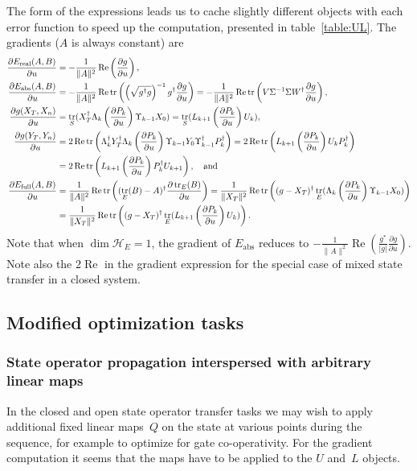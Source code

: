 \documentclass[aps, pra, a4paper, longbibliography, superscriptaddress]{revtex4-1}
\newcommand{\hilb}[1]{\mathcal{#1}}
\DeclareMathOperator{\tr}{tr}
\DeclareMathOperator{\re}{Re}
\newcommand{\spr}{\Upsilon}
\newcommand{\Xt}{X_T}  %
\newcommand{\Xo}{X_0}  %
\newcommand{\Xn}{X_n}  %
\newcommand{\dd}[2]{\frac{\partial #1}{\partial #2}}
\begin{document}
The form of the expressions leads us to cache slightly different objects with
each error function to speed up the computation, presented in table~\ref{table:UL}.
The gradients ($A$ is always constant) are
\begin{align}
\dd{E_\text{real}(A,B)}{u}
&= -\frac{1}{\|A\|^2} \re \left( \dd{g}{u} \right),\\
\dd{E_\text{abs}(A,B)}{u}
&= -\frac{1}{\|A\|^2} \re \tr \left(\left(\sqrt{g^\dagger g}\right)^{-1} g^\dagger \dd{g}{u}\right)
= -\frac{1}{\|A\|^2} \re \tr \left(V \Sigma^{-1} \Sigma W^\dagger \dd{g}{u}\right),\\
\dd{g(\Xt, \Xn)}{u} &= \tr_S(\Xt^\dagger \Lambda_{k} \left(\dd{P_k}{u}\right) \spr_{k-1} \Xo)
= \tr_S(L_{k+1} \left(\dd{P_k}{u}\right) U_{k}),\\
\notag
\dd{g(Y_T, Y_n)}{u} &= 2 \re \tr\left(\Lambda_k^\dagger Y_T^\dagger \Lambda_k \left(\dd{P_k}{u}\right) \spr_{k-1} Y_0 \spr_{k-1}^\dagger P_k^\dagger \right)
= 2 \re \tr\left(L_{k+1} \left(\dd{P_k}{u}\right) U_{k} P_k^\dagger \right)\\
&= 2 \re \tr\left(L_{k+1} \left(\dd{P_k}{u}\right) P_k^\dagger U_{k+1} \right), \quad \text{and}\\
\notag
\dd{E_\text{full}(A, B)}{u}
&= \frac{1}{\|A\|^2} \re \tr\left((\tr_E(B)-A)^\dagger \dd{\tr_E(B)}{u}\right)
= \frac{1}{\|\Xt\|^2} \re \tr\left((g -\Xt)^\dagger  \tr_E(\Lambda_{k} \left(\dd{P_k}{u}\right) \spr_{k-1} \Xo) \right)\\
&= \frac{1}{\|\Xt\|^2} \re \tr\left((g -\Xt)^\dagger  \tr_E(L_{k+1} \left(\dd{P_k}{u}\right) U_{k}) \right).
\end{align}
Note that when $\dim \hilb{H}_E = 1$, the gradient of $E_\text{abs}$
reduces to
$-\frac{1}{\|A\|^2} \re \left(\frac{g^*}{|g|} \dd{g}{u} \right)$.\\
Note also the $2 \re$ in the gradient expression  
for the special case of mixed state transfer in a closed system.


\subsection{Modified optimization tasks}

\subsubsection{State operator propagation interspersed with arbitrary linear maps}

In the closed and open state operator transfer tasks we may wish to apply additional fixed linear maps~$Q$
on the state at various points during the sequence, for example to optimize for gate co-operativity.
For the gradient computation it seems that the maps have to be applied to the $U$ and~$L$ objects.
\end{document}
